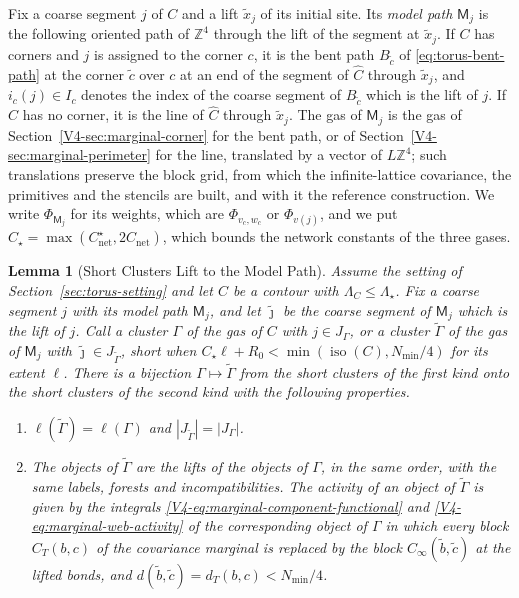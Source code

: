 \documentclass[11pt]{article}
\newcommand{\iso}{\operatorname{iso}}
\numberwithin{equation}{section}
\newtheorem{lemma}[theorem]{Lemma}
\theoremstyle{remark}
\theoremstyle{plain}
\begin{document}
Fix a coarse segment $j$ of $C$ and a lift $\tilde x_j$ of its initial site. Its \emph{model path} $\mathsf M_j$ is the following oriented path of $\mathbb Z^4$ through the lift of the segment at $\tilde x_j$. If $C$ has corners and $j$ is assigned to the corner $c$, it is the bent path $B_{\tilde c}$ of \eqref{eq:torus-bent-path} at the corner $\tilde c$ over $c$ at an end of the segment of $\widehat C$ through $\tilde x_j$, and $i_c(j)\in I_c$ denotes the index of the coarse segment of $B_{\tilde c}$ which is the lift of $j$. If $C$ has no corner, it is the line of $\widehat C$ through $\tilde x_j$. The gas of $\mathsf M_j$ is the gas of Section~\ref{V4-sec:marginal-corner} for the bent path, or of Section~\ref{V4-sec:marginal-perimeter} for the line, translated by a vector of $L\mathbb Z^4$; such translations preserve the block grid, from which the infinite-lattice covariance, the primitives and the stencils are built, and with it the reference construction. We write $\Phi_{\mathsf M_j}$ for its weights, which are $\Phi_{v_c,w_c}$ or $\Phi_{v(j)}$, and we put $C_{\star}=\max(C_{\mathrm{net}}^{\star},2C_{\mathrm{net}})$, which bounds the network constants of the three gases.

\begin{lemma}[Short Clusters Lift to the Model Path]\label{lem:torus-lift}
Assume the setting of Section~\ref{sec:torus-setting} and let $C$ be a contour with $\Lambda_C\leqslant \Lambda_{\star}$. Fix a coarse segment $j$ with its model path $\mathsf M_j$, and let $\tilde\jmath$ be the coarse segment of $\mathsf M_j$ which is the lift of $j$. Call a cluster $\Gamma$ of the gas of $C$ with $j\in J_{\Gamma}$, or a cluster $\widetilde\Gamma$ of the gas of $\mathsf M_j$ with $\tilde\jmath\in J_{\widetilde\Gamma}$, \emph{short} when $C_{\star}\ell+R_0<\min(\iso(C),N_{\min}/4)$ for its extent $\ell$. There is a bijection $\Gamma\mapsto\widetilde\Gamma$ from the short clusters of the first kind onto the short clusters of the second kind with the following properties.
\begin{enumerate}[label=(\alph*)]
    \item $\ell(\widetilde\Gamma)=\ell(\Gamma)$ and $| J_{\widetilde\Gamma}|=| J_{\Gamma}|$.
    \item The objects of $\widetilde\Gamma$ are the lifts of the objects of $\Gamma$, in the same order, with the same labels, forests and incompatibilities. The activity of an object of $\widetilde\Gamma$ is given by the integrals \eqref{V4-eq:marginal-component-functional} and \eqref{V4-eq:marginal-web-activity} of the corresponding object of $\Gamma$ in which every block $C_T(b,c)$ of the covariance marginal is replaced by the block $C_{\infty}(\tilde b,\tilde c)$ at the lifted bonds, and $d(\tilde b,\tilde c)= d_T(b,c)< N_{\min}/4$.
\end{enumerate}
\end{lemma}
\end{document}
